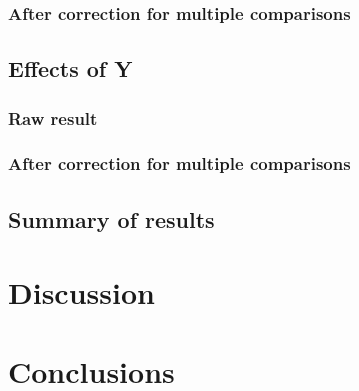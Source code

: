 \documentclass[paper=a4,fontsize=11pt,twocolumn]{article}
\begin{document}
\lipsum[12]
\subsubsection{After correction for multiple comparisons}
\lipsum[13]

\subsection{Effects of Y}
\subsubsection{Raw result}
\lipsum[14]
\subsubsection{After correction for multiple comparisons}
\lipsum[15]

\subsection{Summary of results}
\lipsum[16-18]

\section{Discussion}
\lipsum[19-23]

\section{Conclusions}
\lipsum[24-32]
\end{document}
